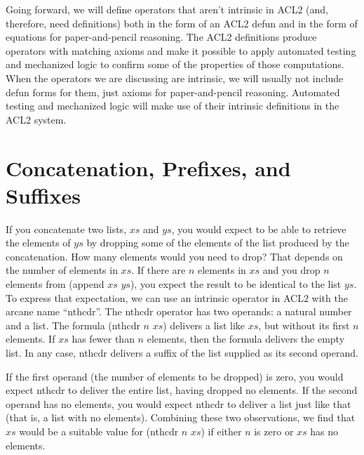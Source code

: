 Going forward, we will define operators that aren't
intrinsic in ACL2 (and, therefore, need definitions)
both in the form of an ACL2 defun
and in the form of equations for paper-and-pencil reasoning.
The ACL2 definitions produce operators with matching axioms and
make it possible to apply automated testing and mechanized logic
to confirm some of the properties of those computations.
When the operators we are discussing are intrinsic,
we will usually not include defun forms for them,
just axioms for paper-and-pencil reasoning.
Automated testing and mechanized logic will make use
of their intrinsic definitions in the ACL2 system.

\section{Concatenation, Prefixes, and Suffixes}
\label{sec:append-prefix-suffix}

If you concatenate two lists, $xs$ and $ys$,
you would expect to be able to retrieve the elements
of $ys$ by dropping some of the elements of the list
produced by the concatenation.
How many elements would you need to drop?
That depends on the number of elements in $xs$.
If there are $n$ elements in $xs$ and you drop $n$ elements
from (append $xs$ $ys$), you expect the result to be identical
to the list $ys$. To express that expectation, we can use
an intrinsic operator in ACL2 with the arcane name ``nthcdr''.
The nthcdr operator has two operands: a natural number and a list.
The formula (nthcdr $n$ $xs$) delivers a list like $xs$,
but without its first $n$ elements.
If $xs$ has fewer than $n$ elements,
then the formula delivers the empty list.
In any case, nthcdr delivers a suffix of the list
supplied as its second operand.

If the first operand (the number of elements to be dropped) is zero,
you would expect
nthcdr to deliver the entire list, having dropped no elements.
If the second operand has no elements,
you would expect
nthcdr to deliver a list just like that
(that is, a list with no elements).
Combining these two observations, we find that
$xs$ would be a suitable value for (nthcdr $n$ $xs$)
if either $n$ is zero or $xs$ has no elements.

